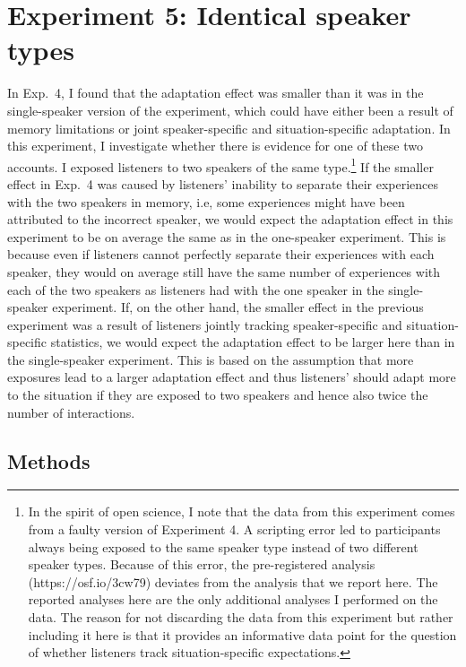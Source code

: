 \section{Experiment 5: Identical speaker types}

In Exp.~4, I found that the adaptation effect was smaller than it was in the single-speaker version of the experiment,
which could have either been a result of memory limitations or joint speaker-specific and situation-specific adaptation. 
In this experiment, I investigate
whether there is evidence for one of these two accounts. I 
exposed listeners to two speakers of the same type.\footnote{
In the spirit of open science, I note that the data from this 
experiment comes from a faulty version of Experiment 4. 
A scripting error led to  participants always being exposed to the 
same speaker type instead of two different speaker types. Because 
of this error, the pre-registered analysis (https://osf.io/3cw79) 
deviates from the analysis that we report here. The reported analyses 
here are the only additional analyses I performed on the data. The 
reason for not discarding the data from this experiment but rather including 
it here is that it provides  an informative data point for the question of whether
listeners track situation-specific expectations.
}
If the smaller effect in Exp.~4 was caused by listeners' inability to separate their experiences with the two speakers in memory, i.e, some experiences might have been attributed to the incorrect speaker, we would expect the adaptation effect in this experiment to be on average the same as in the one-speaker experiment. This is because even if listeners cannot perfectly separate their experiences with each speaker, they would on average still have the same number of experiences with each of the two speakers as listeners had with the one speaker in the single-speaker experiment. If, on the other hand, the smaller effect in the previous experiment was a result of listeners jointly tracking speaker-specific and situation-specific statistics, we would expect the adaptation effect to be larger here than in the single-speaker experiment. This is based on the assumption that more exposures lead to a larger adaptation effect and thus listeners' should adapt more to the situation if they are exposed to two speakers and hence also twice the number of interactions.

\subsection{Methods}

